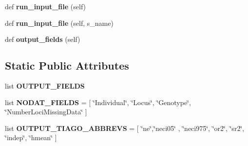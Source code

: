 \begin{DoxyCompactItemize}
\item 
def {\bfseries run\+\_\+input\+\_\+file} (self)\hypertarget{classnegui_1_1pgoutputneestimator_1_1PGOutputNeEstimator_ac3204c39eb40e0e5a9c16906382d98a5}{}\label{classnegui_1_1pgoutputneestimator_1_1PGOutputNeEstimator_ac3204c39eb40e0e5a9c16906382d98a5}

\item 
def {\bfseries run\+\_\+input\+\_\+file} (self, s\+\_\+name)\hypertarget{classnegui_1_1pgoutputneestimator_1_1PGOutputNeEstimator_aaa66e700b71e0f86af69c9301be4aed2}{}\label{classnegui_1_1pgoutputneestimator_1_1PGOutputNeEstimator_aaa66e700b71e0f86af69c9301be4aed2}

\item 
def {\bfseries output\+\_\+fields} (self)\hypertarget{classnegui_1_1pgoutputneestimator_1_1PGOutputNeEstimator_a3c833e27a8bf526b8e0003843d21f7aa}{}\label{classnegui_1_1pgoutputneestimator_1_1PGOutputNeEstimator_a3c833e27a8bf526b8e0003843d21f7aa}

\end{DoxyCompactItemize}
\subsection*{Static Public Attributes}
\begin{DoxyCompactItemize}
\item 
list {\bfseries O\+U\+T\+P\+U\+T\+\_\+\+F\+I\+E\+L\+DS}
\item 
list {\bfseries N\+O\+D\+A\+T\+\_\+\+F\+I\+E\+L\+DS} = \mbox{[} \char`\"{}Individual\char`\"{}, \char`\"{}Locus\char`\"{}, \char`\"{}Genotype\char`\"{}, \char`\"{}Number\+Loci\+Missing\+Data\char`\"{} \mbox{]}\hypertarget{classnegui_1_1pgoutputneestimator_1_1PGOutputNeEstimator_a4e5c6c9926a8f963e36d83d858366c4d}{}\label{classnegui_1_1pgoutputneestimator_1_1PGOutputNeEstimator_a4e5c6c9926a8f963e36d83d858366c4d}

\item 
list {\bfseries O\+U\+T\+P\+U\+T\+\_\+\+T\+I\+A\+G\+O\+\_\+\+A\+B\+B\+R\+E\+VS} = \mbox{[} \char`\"{}ne\char`\"{},\char`\"{}neci05\char`\"{} , \char`\"{}neci975\char`\"{}, \char`\"{}or2\char`\"{}, \char`\"{}sr2\char`\"{}, \char`\"{}indep\char`\"{}, \char`\"{}hmean\char`\"{} \mbox{]}\hypertarget{classnegui_1_1pgoutputneestimator_1_1PGOutputNeEstimator_a916a47666e6360ea279b944832907b27}{}\label{classnegui_1_1pgoutputneestimator_1_1PGOutputNeEstimator_a916a47666e6360ea279b944832907b27}

\end{DoxyCompactItemize}


